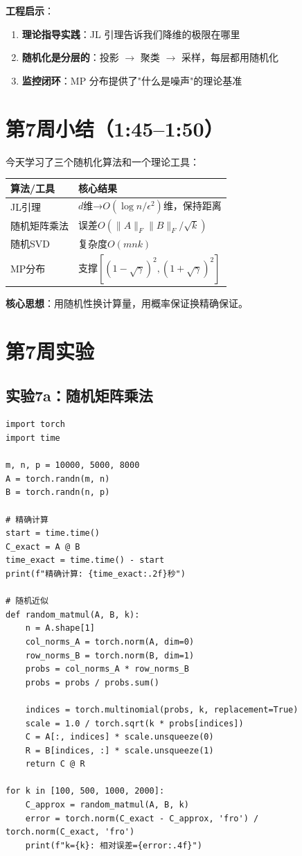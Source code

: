 \documentclass[11pt,a4paper]{ctexart}
\theoremstyle{definition}
\theoremstyle{remark}
\begin{document}
\textbf{工程启示}：
\begin{enumerate}
    \item \textbf{理论指导实践}：JL 引理告诉我们降维的极限在哪里
    \item \textbf{随机化是分层的}：投影 $\to$ 聚类 $\to$ 采样，每层都用随机化
    \item \textbf{监控闭环}：MP 分布提供了"什么是噪声"的理论基准
\end{enumerate}



\section{第7周小结（1:45--1:50）}

今天学习了三个随机化算法和一个理论工具：

\begin{table}[h]
\centering
\begin{tabular}{ll}
\toprule
算法/工具 & 核心结果 \\
\midrule
JL引理 & $d$维→$O(\log n/\epsilon^2)$维，保持距离 \\
随机矩阵乘法 & 误差$O(\|A\|_F\|B\|_F/\sqrt{k})$ \\
随机SVD & 复杂度$O(mnk)$ \\
MP分布 & 支撑$[(1-\sqrt\gamma)^2, (1+\sqrt\gamma)^2]$ \\
\bottomrule
\end{tabular}
\end{table}

\textbf{核心思想}：用随机性换计算量，用概率保证换精确保证。

\section{第7周实验}

\subsection{实验7a：随机矩阵乘法}

\begin{lstlisting}
import torch
import time

m, n, p = 10000, 5000, 8000
A = torch.randn(m, n)
B = torch.randn(n, p)

# 精确计算
start = time.time()
C_exact = A @ B
time_exact = time.time() - start
print(f"精确计算: {time_exact:.2f}秒")

# 随机近似
def random_matmul(A, B, k):
    n = A.shape[1]
    col_norms_A = torch.norm(A, dim=0)
    row_norms_B = torch.norm(B, dim=1)
    probs = col_norms_A * row_norms_B
    probs = probs / probs.sum()
    
    indices = torch.multinomial(probs, k, replacement=True)
    scale = 1.0 / torch.sqrt(k * probs[indices])
    C = A[:, indices] * scale.unsqueeze(0)
    R = B[indices, :] * scale.unsqueeze(1)
    return C @ R

for k in [100, 500, 1000, 2000]:
    C_approx = random_matmul(A, B, k)
    error = torch.norm(C_exact - C_approx, 'fro') / torch.norm(C_exact, 'fro')
    print(f"k={k}: 相对误差={error:.4f}")
\end{lstlisting}
\end{document}
